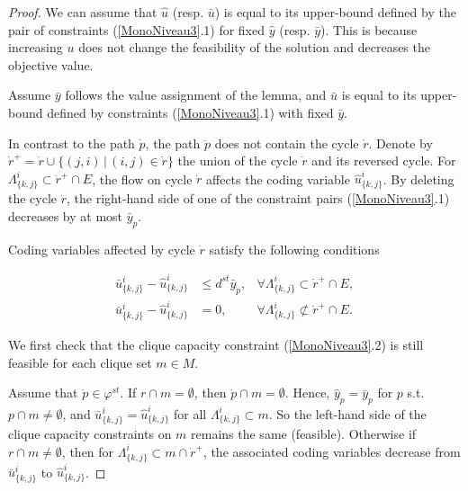 \begin{proof}

We can assume  that \( \widehat{u}\) (resp. \(\bar{u}\))  is equal to its upper-bound defined by the pair of constraints (\ref{MonoNiveau3}.1) for fixed \(\widehat{y}\) (resp. \(\bar{y}\)). This is because increasing \(u\) does not change the feasibility of the solution and decreases the objective value.

Assume \(\bar{y}\) follows the value assignment of the lemma, and \(\bar{u}\) is equal to its upper-bound defined by constraints (\ref{MonoNiveau3}.1) with fixed \(\bar{y}\).

In contrast to the path \(\dot{p}\), the path \(\ddot{p}\) does not contain the cycle \(\dot{r}\). Denote by \(\dot{r}^+ = \dot{r} \cup \{(j,i)\,|\, (i,j) \in \dot{r}\}\) the union of the cycle \( \dot{r}\) and its reversed cycle. For \(\Lambda^i_{\{k,j\}} \subset \dot{r}^+ \cap E\), the flow on cycle \(\dot{r}\) affects the coding variable \(\widehat{u}^i_{\{k,j\}}\). By deleting the cycle \(\dot{r}\), the right-hand side of one of  the constraint pairs (\ref{MonoNiveau3}.1) decreases by at most \(\bar{y}_{\dot{p}}\).

Coding variables affected by cycle \(\dot{r}\) satisfy the following conditions

\begin{align}
\label{codcycle}
          \bar{u}^i_{\{k,j\}} - \widehat{u}^i_{\{k,j\}} & \le d^{st} \bar{y}_{\dot{p}}, & \forall \Lambda^i_{\{k,j\}} \subset  \dot{r}^+ \cap E, \\
         \bar{u}^i_{\{k,j\}} - \widehat{u}^i_{\{k,j\}} & = 0, & \forall \Lambda^i_{\{k,j\}} \not \subset   \dot{r}^+ \cap E.
\end{align}


We first check that the clique capacity constraint (\ref{MonoNiveau3}.2) is still feasible for each clique set \(m \in  M\).

Assume that \(\dot{p} \in \varphi^{st}\). If \(r \cap m = \emptyset\), then \(\dot{p} \cap m = \emptyset\). Hence, \(\widehat{y}_{p} = \bar{y}_{p}\) for \(p\) s.t. \(p \cap m \ne \emptyset\), and \(\bar{u}^i_{\{k,j\}} = \widehat{u}^i_{\{k,j\}}\) for all \(\Lambda^i_{\{k,j\}} \subset m \).
 So the left-hand side of the clique capacity constraints on \(m\) remains the same (feasible).
 Otherwise if \(r \cap m \ne \emptyset\), then for \(\Lambda^i_{\{k,j\}} \subset m \cap  \dot{r}^+\), the associated coding variables decrease from  \(\bar{u}^i_{\{k,j\}}\) to \(\widehat{u}^i_{\{k,j\}}\).


\end{proof}
